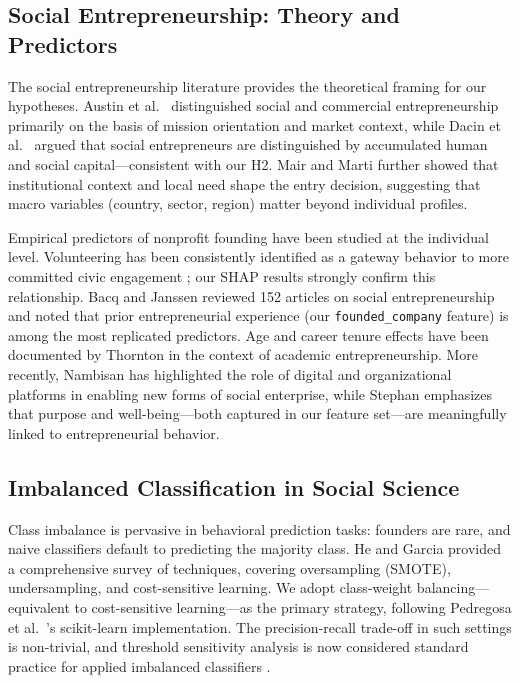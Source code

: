 \documentclass[10pt,twocolumn]{article}
\begin{document}
\subsection{Social Entrepreneurship: Theory and Predictors}

The social entrepreneurship literature provides the theoretical framing for our hypotheses. Austin et al.\ \cite{modem2021} distinguished social and commercial entrepreneurship primarily on the basis of mission orientation and market context, while Dacin et al.\ \cite{sullivan2021} argued that social entrepreneurs are distinguished by accumulated human and social capital—consistent with our H2. Mair and Marti \cite{oliveira2020} further showed that institutional context and local need shape the entry decision, suggesting that macro variables (country, sector, region) matter beyond individual profiles.

Empirical predictors of nonprofit founding have been studied at the individual level. Volunteering has been consistently identified as a gateway behavior to more committed civic engagement \cite{schmid2025}; our SHAP results strongly confirm this relationship. Bacq and Janssen \cite{modem2021} reviewed 152 articles on social entrepreneurship and noted that prior entrepreneurial experience (our \texttt{founded\_company} feature) is among the most replicated predictors. Age and career tenure effects have been documented by Thornton \cite{sullivan2021} in the context of academic entrepreneurship. More recently, Nambisan \cite{alnaemi2026} has highlighted the role of digital and organizational platforms in enabling new forms of social enterprise, while Stephan \cite{udayar2025} emphasizes that purpose and well-being—both captured in our feature set—are meaningfully linked to entrepreneurial behavior.

\subsection{Imbalanced Classification in Social Science}

Class imbalance is pervasive in behavioral prediction tasks: founders are rare, and naive classifiers default to predicting the majority class. He and Garcia \cite{naveenkumar2026} provided a comprehensive survey of techniques, covering oversampling (SMOTE), undersampling, and cost-sensitive learning. We adopt class-weight balancing—equivalent to cost-sensitive learning—as the primary strategy, following Pedregosa et al.\ \cite{pedregosa2011}'s scikit-learn implementation. The precision-recall trade-off in such settings is non-trivial, and threshold sensitivity analysis is now considered standard practice for applied imbalanced classifiers \cite{naveenkumar2026}.
\end{document}
